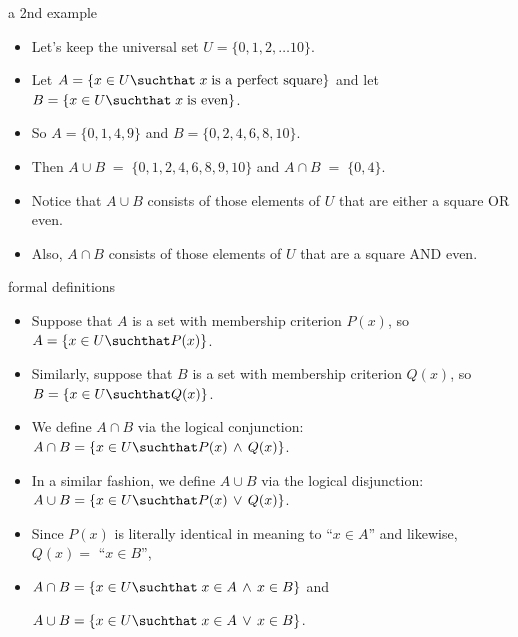 \documentclass[handout,landscape]{beamer}
\begin{document}
\begin{frame}{a 2nd example}
\begin{itemize}
\item Let's keep the universal set $U = \{0,1,2, \ldots 10 \}$. \pause
\item Let $A = \{x \in U \suchthat\; x \; \mbox{is a perfect square} \}$ and let $B = \{x \in U \suchthat\; x \; \mbox{is even} \}$. \pause
\item So $A = \{0,1,4,9\}$ \pause and $B = \{0,2,4,6,8,10\}$. \pause
\item Then $A \cup B \; = \; \{ 0, 1, 2, 4, 6, 8, 9, 10 \}$ \pause \hspace{.2in} and $A \cap B \; = \; \{ 0, 4 \}$. \pause
\item Notice that $A \cup B$ consists of those elements of $U$ that are either a square OR even. \pause
\item Also, $A \cap B$ consists of those elements of $U$ that are a square AND even.
\end{itemize}
\end{frame}

\begin{frame}{formal definitions}
\begin{itemize}
\item Suppose that $A$ is a set with membership criterion $P(x)$, \pause \newline
so $A = \{ x \in U \suchthat P(x)\}$. \pause
\item Similarly, suppose that $B$ is a set with membership criterion $Q(x)$, \pause \newline
so $B = \{ x \in U \suchthat Q(x)\}$. \pause
\item We define $A \cap B$ via the logical conjunction: \pause \newline
$A \cap B = \{ x \in U \suchthat P(x) \, \land\, Q(x)\}$. \pause
\item In a similar fashion, we define $A \cup B$ via the logical disjunction: \pause \newline
$A \cup B = \{ x \in U \suchthat P(x) \, \lor\, Q(x)\}$. \pause
\item Since $P(x)$ is literally identical in meaning to ``$x \in A$'' and likewise, $Q(x) = $ ``$x \in B$'', \pause 
\item \rule{0pt}{18pt}$A \cap B = \{ x \in U \suchthat\; x \in A \, \land \, x \in B \}$ and \pause \rule{0pt}{18pt}$A \cup B = \{ x \in U \suchthat \; x \in A \, \lor \, x \in B \}$.
\end{itemize}
\end{frame}
\end{document}
